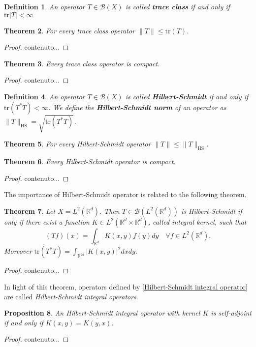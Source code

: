 \documentclass[corpo=11pt, stile=classica, tipotesi=custom,
greek, evenboxes, english]{toptesi}
\numberwithin{equation}{chapter}
\newtheorem{teo}{Theorem}[chapter] %
\newtheorem{defi}[teo]{Definition}
\newtheorem{prop}[teo]{Proposition}
\theoremstyle{remark}
\newcommand{\R}{\mathbb{R}} %
\newcommand{\B}{\mathscr{B}} %
\begin{document}
\begin{defi}\label{trace class def}
	An operator $T \in \B(X)$ is called \textbf{trace class} if and only if $\mathrm{tr}|T| < \infty$
\end{defi}
\begin{teo}
	For every trace class operator $\| T \| \leq \mathrm{tr}(T)$.
\end{teo}
\begin{proof}
	contenuto...
\end{proof}
\begin{teo}
	Every trace class operator is compact.
\end{teo}
\begin{proof}
	contenuto...
\end{proof}
\begin{defi}\label{Hilbert-Schmidt operator def}
	An operator $T \in \B(X)$ is called \textbf{Hilbert-Schmidt} if and only if $\mathrm{tr}(T^*T) < \infty$. We define the \textbf{Hilbert-Schmidt norm} of an operator as $\|T\|_{\mathrm{HS}} = \sqrt{\mathrm{tr}(T^*T)}$.
\end{defi}
\begin{teo}\label{Hilbert-Schmidt operator norm}
	For every Hilbert-Schmidt operator $\| T \| \leq \| T \|_{\mathrm{HS}}$.
\end{teo}
\begin{teo}\label{Hilbert-Schmidt operators are compact}
	Every Hilbert-Schmidt operator is compact.
\end{teo}
\begin{proof}
	contenuto...
\end{proof}
The importance of Hilbert-Schmidt operator is related to the following theorem.
\begin{teo}
	Let $X = L^2(\R^d)$. Then $T \in \B(L^2(\R^d))$ is Hilbert-Schmidt if only if there exist a function $K \in L^2(\R^d \times \R^d)$, called integral kernel, such that
	\begin{equation}\label{Hilbert-Schmidt integral operator}
		(Tf)(x) = \int_{\R^d} K(x,y)f(y)dy \quad \forall f \in L^2(\R^d).
	\end{equation}
	Moreover $\mathrm{tr}(T^*T) = \int_{\R^{2d}} |K(x,y)|^2 dxdy$.
\end{teo}
\begin{proof}
	contenuto...
\end{proof}
In light of this theorem, operators defined by \eqref{Hilbert-Schmidt integral operator} are called \emph{Hilbert-Schmidt integral operators}.

\begin{prop}\label{condition integral operator self-adjoint}
	An Hilbert-Schmidt integral operator with kernel $K$ is self-adjoint if and only if $K(x,y) = \overline{K(y,x)}$.
\end{prop}
\begin{proof}
	contenuto...
\end{proof}
\end{document}
